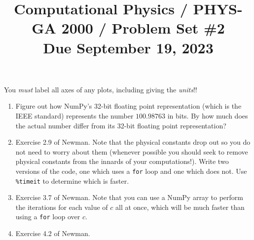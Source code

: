 \documentclass[11pt, preprint]{aastex}
\begin{document}
\title{\bf Computational Physics / PHYS-GA 2000 / Problem Set \#2
\\ Due September 19, 2023 }

You {\it must} label all axes of any plots, including giving the {\it
  units}!!

\begin{enumerate}

  \item Figure out how NumPy's 32-bit floating point representation
    (which is the IEEE standard) represents the number $100.98763$ in
    bits. By how much does the actual number differ from its 32-bit
    floating point representation?

  \item Exercise 2.9 of Newman. Note that the physical constants drop
    out so you do not need to worry about them (whenever possible you
    should seek to remove physical constants from the innards of your
    computations!).  Write two versions of the code, one which uses a
    {\tt for} loop and one which does not.  Use {\tt \%timeit} to
    determine which is faster.

  \item Exercise 3.7 of Newman.  Note that you can use a NumPy array
    to perform the iterations for each value of $c$ all at once, which
    will be much faster than using a {\tt for} loop over $c$.

  \item Exercise 4.2 of Newman.

\end{enumerate}
\end{document}
